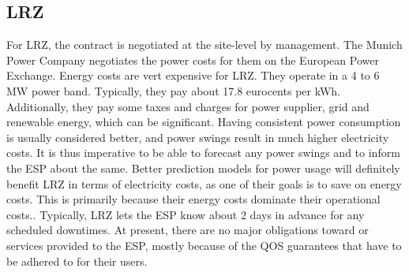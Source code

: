 \subsection{LRZ}
For LRZ, the contract is negotiated at the site-level by management. The Munich Power Company negotiates the power costs for them on the European Power Exchange. Energy costs are vert expensive for LRZ. They operate in a 4 to 6 MW power band. Typically, they pay about 17.8 eurocents per kWh. Additionally, they pay some taxes and charges for power supplier, grid and renewable energy, which can be significant. Having consistent power consumption is usually considered better, and power swings result in much higher electricity costs. It is thus imperative to be able to forecast any power swings and to inform the ESP about the same. Better prediction models for power usage will definitely benefit LRZ in terms of electricity costs, as one of their goals is to save on energy costs. This is primarily because their energy costs dominate their operational costs.. Typically, LRZ lets the ESP know about 2 days in advance for any scheduled downtimes. At present, there are no major obligations toward or services provided to the ESP, mostly because of the QOS guarantees that have to be adhered to for their users. 
%
%
%
